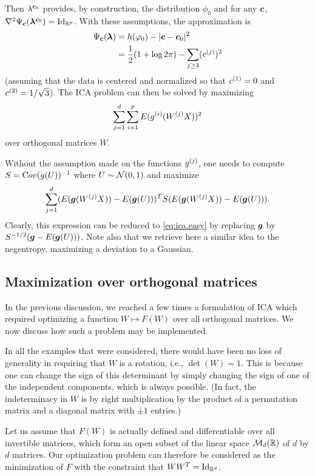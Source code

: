 Then $\lambda^{{\bm{c}}_{0}}$ provides, by construction, the distribution $\phi_0$ and  for any ${\bm{c}}$, $\nabla^2\Psi_\bfc(\boldsymbol\la^{\bfc_{0}}) = \Id[p]$. With these assumptions, the approximation is 
\begin{align*}
\Psi_{\bm{c}}(\bm{\lambda}) &= h(\varphi_0) - |{\bm{c}}-{\bm{c}}_{0}|^2\\
&= \frac12(1+ \log 2\pi) - \sum_{j\geq 3} (c^{(j)})^2 
\end{align*}
(assuming that the data is centered and normalized so that $c^{(1)} = 0$ and $c^{(2)} = 1/\sqrt 3$). The ICA problem can then be solved by maximizing
\begin{equation}
\label{eq:ica.easy}
\sum_{j=1}^d \sum_{i=1}^p E(g^{(i)}(W^{(j)} X))^2
\end{equation}
over orthogonal matrices $W$. 

\begin{remark}
Without the assumption made on the functions $g^{(j)}$, one needs to compute $S = {\mathrm Cov}(g(U))^{-1}$ where $U\sim {\mathcal N}(0,1)$ and maximize
\[
\sum_{j=1}^d (E({\bm{g}}(W^{(j)} X)) - E({\bm{g}}(U)))^TS(E({\bm{g}}(W^{(j)} X)) - E({\bm{g}}(U))).
\]
Clearly, this expression can be reduced to \cref{eq:ica.easy} by replacing ${\bm{g}}$ by $S^{-1/2}({\bm{g}}- E({\bm{g}}(U)))$. Note also that we retrieve here a similar idea to the negentropy, maximizing a deviation to a Gaussian.
\end{remark}

\subsection{Maximization over orthogonal matrices}
\label{sec:grad.orthogonal}
In the previous discussion, we reached a few times a formulation of ICA which required optimizing a function $W \mapsto F(W)$ over all orthogonal matrices. We now discuss how such a problem may be implemented. 

In all the examples that were considered, there would have been no loss of generality in requiring that $W$ is a rotation, i.e., $\det(W) = 1$. This is because one can change the sign of this determinant by simply changing the sign of one of the independent components, which is always possible. (In fact, the indeterminacy in $W$ is by right multiplication by the product of a permutation matrix and a diagonal matrix with $\pm1$ entries.)

Let us assume that $F(W)$ is actually defined and differentiable over all invertible matrices, which form an open subset of the linear space ${\mathcal M}_d({\mathbb{R}})$ of $d$ by $d$ matrices.  Our optimization problem can therefore be considered as the minimization of $F$ with the constraint that $WW^T = \Id[d]$. 

